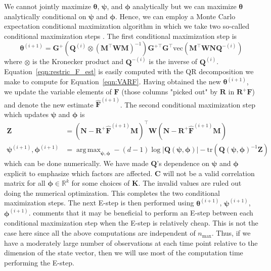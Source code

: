 \documentclass[notitlepage]{article}
\DeclareMathOperator*{\argmax}{arg\,max}
\renewcommand{\vec}[1]{\bm{#1}}
\newcommand{\mat}[1]{\mathbf{#1}}
\newcommand{\Lparen}[1]{\left( #1\right)}
\newcommand{\Lvert}[1]{\left\vert #1\right\vert}
\newcommand{\optor}[2]{#1\Lparen{#2}}
\newcommand{\vecOP}[1]{\optor{\text{vec}}{#1}}
\newcommand{\nPeriods}{d}
\newcommand{\nMax}{n_{\text{max}}}
\begin{document}
We cannot jointly maximize $\vec{\theta}$, $\vec{\psi}$, and $\vec{\phi}$ analytically but we can maximize $\vec{\theta}$ analytically conditional on $\vec{\psi}$ and $\vec{\phi}$. Hence, we can employ a Monte Carlo expectation conditional maximization algorithm in which we take two so-called conditional maximization steps \citep[see][on the, non-Monte Carlo, expectation maximization algorithm]{meng93}. 
The first conditional maximization step is %
%
\begin{equation}\label{eqn:restric_F_est}
\vec{\theta}^{(i + 1)} =
	\mat{G}^+
	\Lparen{\mat{Q}^{(i)} \otimes \Lparen{\mat{M}^\top\mat{W}\mat{M}}^{-1}}
	\mat{G}^{+\top}\mat{G}^\top	
	\vecOP{\mat{M}^\top\mat{W}\mat{N}\mat{Q}^{-(i)}}
\end{equation}%
% 
where $\otimes$ is the Kronecker product and $\mat{Q}^{-(i)}$ is the inverse 
of $\mat{Q}^{(i)}$. Equation~\eqref{eqn:restric_F_est} is easily computed 
with the QR decomposition we 
make to compute for Equation~\eqref{eqn:VARF}. Having obtained the new 
$\vec{\theta}^{(i + 1)}$, we update the variable elements of $\mat{F}$ (those 
columns "picked out" by $\mat{R}$ in $\mat{R}^+\mat{F}$) and denote the new 
estimate $\widehat{\mat{F}}^{(i + 1)}$. The second conditional maximization 
step which updates $\vec{\psi}$ and $\vec{\phi}$ is %
%
\begin{align*}
\mat{Z} &= \Lparen{\mat{N} - \mat{R}^+\widehat{\mat{F}}^{(i +1)}\mat{M}}^\top\mat{W}
           \Lparen{\mat{N} - \mat{R}^+\widehat{\mat{F}}^{(i +1)}\mat{M}} \\
\vec{\psi}^{(i+1)},\vec{\phi}^{(i+1)} &= \argmax_{\vec{\psi},\vec{\phi}} 
   -(\nPeriods - 1)\log\Lvert{\mat{Q}(\vec{\psi},\vec{\phi})}
   -\text{tr}\Lparen{\mat{Q}(\vec{\psi},\vec{\phi})^{-1}\mat{Z}}
\end{align*}%
% 
which can be done numerically. We have made $\mat{Q}$'s dependence on $\vec{\psi}$ and $\vec{\phi}$ explicit to emphasize which factors are affected. $\mat{C}$ will not be a valid correlation matrix for all $\vec\phi\in\mathbb{R}^k$ for some choices of $\mat{K}$. The invalid values are ruled out doing the numerical optimization. This completes the two conditional maximization steps. The next E-step is then performed using $\vec{\theta}^{(i + 1)}$, $\vec{\psi}^{(i +1)}$, $\vec{\phi}^{(i + 1)}$. \citet[][see the discussion]{meng93} comments that it may be beneficial to perform an E-step between each conditional maximization step when the E-step is relatively cheap. 
This is not the case here since all the above computations are independent 
of $\nMax$.
Thus, if we have a moderately large number of observations at each time point relative to 
the dimension of the state vector, then we will use most of the 
computation time performing the E-step.
\end{document}
